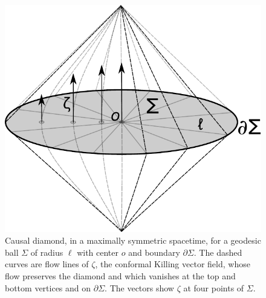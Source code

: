 \documentclass[aps,prd,showpacs,groupedaddress,nofootinbib,longbibliography,12pt]{revtex4-1}
\def\z{\zeta}
\begin{document}
%
\begin{figure}
\centering
\includegraphics[scale=0.6]{doublecone3.pdf}
\caption{Causal diamond, in a maximally symmetric spacetime, for a geodesic ball $\Sigma$ of radius $\ell$ with center $o$ and boundary $\partial \Sigma$. 
The dashed curves are flow lines of $\z$, the conformal Killing vector field, whose flow preserves the diamond
and  which vanishes at the top and bottom vertices and on $\partial\Sigma$.
The vectors show $\z$ at four points of $\Sigma$.}
\label{doublecone}
\end{figure}
%
\end{document}
